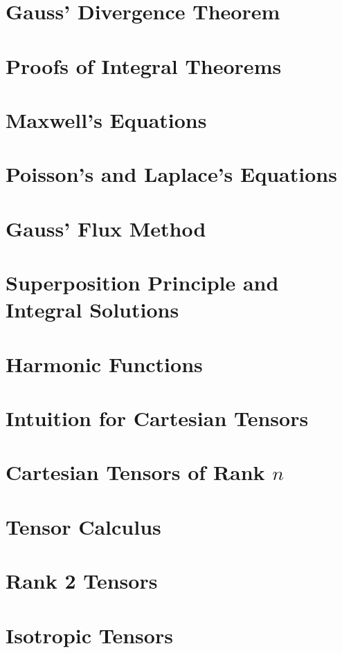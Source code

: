 \documentclass{article}
\begin{document}
\section{Gauss' Divergence Theorem}

\section{Proofs of Integral Theorems}

\section{Maxwell's Equations}

\section{Poisson's and Laplace's Equations}

\section{Gauss' Flux Method}

\section{Superposition Principle and Integral Solutions}

\section{Harmonic Functions}

\section{Intuition for Cartesian Tensors}

\section{Cartesian Tensors of Rank $n$}

\section{Tensor Calculus}

\section{Rank 2 Tensors}

\section{Isotropic Tensors}

\end{document}
